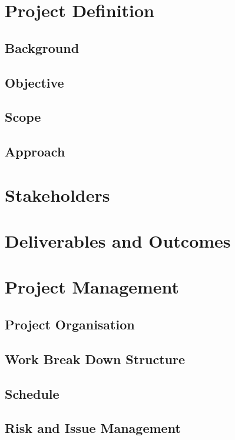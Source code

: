 \documentclass[11pt]{article}
\begin{document}
\section{Project Definition}

\subsection{Background}

\subsection{Objective}

\subsection{Scope}

\subsection{Approach}

\section{Stakeholders}

\section{Deliverables and Outcomes}

\section{Project Management}

\subsection{Project Organisation}

\subsection{Work Break Down Structure}

\subsection{Schedule}

\subsection{Risk and Issue Management}
\end{document}
